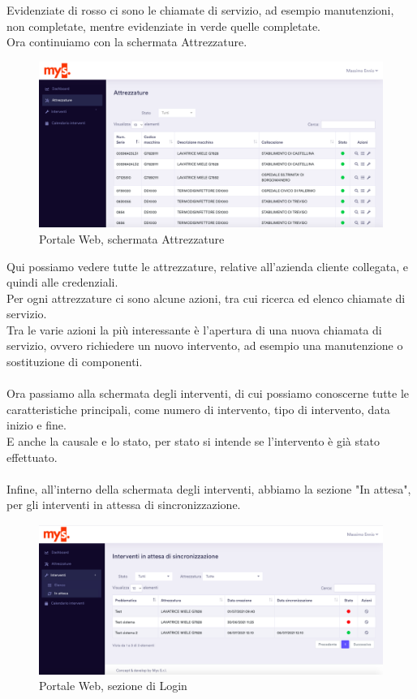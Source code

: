 Evidenziate di rosso ci sono le chiamate di servizio, ad esempio manutenzioni, non completate, mentre evidenziate in verde quelle completate.\\
Ora continuiamo con la schermata Attrezzature.
\begin{figure}[!h] 
	\centering 
	\includegraphics[scale = 0.6]{immagini/portale/attrezzature.png} 
	\caption {Portale Web, schermata Attrezzature}
\end{figure}
Qui possiamo vedere tutte le attrezzature, relative all'azienda cliente collegata, e quindi alle credenziali.\\
Per ogni attrezzature ci sono alcune azioni, tra cui ricerca ed elenco chiamate di servizio.\\Tra le varie azioni la più interessante è l'apertura di una nuova chiamata di servizio, ovvero richiedere un nuovo intervento, ad esempio una manutenzione o sostituzione di componenti.\\\\
Ora passiamo alla schermata degli interventi, di cui possiamo conoscerne tutte le caratteristiche principali, come numero di intervento, tipo di intervento, data inizio e fine.\\
E anche la causale e lo stato, per stato si intende se l'intervento è già stato effettuato.\\\\Infine, all'interno della schermata degli interventi, abbiamo la sezione "In attesa", per gli interventi in attessa di sincronizzazione.
\begin{figure}[!h] 
	\centering 
	\includegraphics[scale = 0.6]{immagini/portale/interventi-in-attesa.png} 
	\caption {Portale Web, sezione di Login}
\end{figure}

